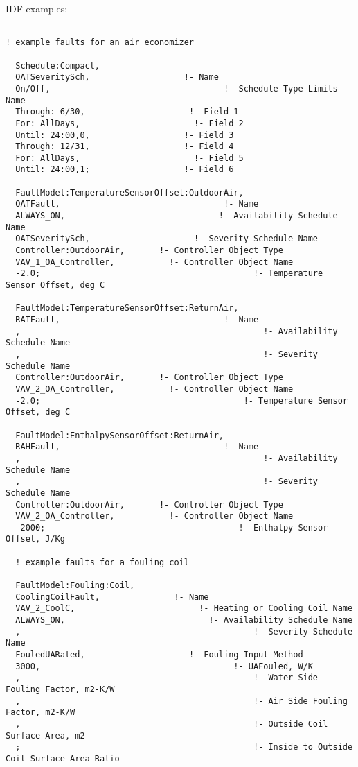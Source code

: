 IDF examples:

\begin{lstlisting}

! example faults for an air economizer

  Schedule:Compact,
  OATSeveritySch,                   !- Name
  On/Off,                                   !- Schedule Type Limits Name
  Through: 6/30,                     !- Field 1
  For: AllDays,                       !- Field 2
  Until: 24:00,0,                   !- Field 3
  Through: 12/31,                   !- Field 4
  For: AllDays,                       !- Field 5
  Until: 24:00,1;                   !- Field 6

  FaultModel:TemperatureSensorOffset:OutdoorAir,
  OATFault,                                 !- Name
  ALWAYS_ON,                               !- Availability Schedule Name
  OATSeveritySch,                     !- Severity Schedule Name
  Controller:OutdoorAir,       !- Controller Object Type
  VAV_1_OA_Controller,           !- Controller Object Name
  -2.0;                                           !- Temperature Sensor Offset, deg C

  FaultModel:TemperatureSensorOffset:ReturnAir,
  RATFault,                                 !- Name
  ,                                                 !- Availability Schedule Name
  ,                                                 !- Severity Schedule Name
  Controller:OutdoorAir,       !- Controller Object Type
  VAV_2_OA_Controller,           !- Controller Object Name
  -2.0;                                         !- Temperature Sensor Offset, deg C

  FaultModel:EnthalpySensorOffset:ReturnAir,
  RAHFault,                                 !- Name
  ,                                                 !- Availability Schedule Name
  ,                                                 !- Severity Schedule Name
  Controller:OutdoorAir,       !- Controller Object Type
  VAV_2_OA_Controller,           !- Controller Object Name
  -2000;                                       !- Enthalpy Sensor Offset, J/Kg

  ! example faults for a fouling coil

  FaultModel:Fouling:Coil,
  CoolingCoilFault,               !- Name
  VAV_2_CoolC,                         !- Heating or Cooling Coil Name
  ALWAYS_ON,                             !- Availability Schedule Name
  ,                                               !- Severity Schedule Name
  FouledUARated,                     !- Fouling Input Method
  3000,                                       !- UAFouled, W/K
  ,                                               !- Water Side Fouling Factor, m2-K/W
  ,                                               !- Air Side Fouling Factor, m2-K/W
  ,                                               !- Outside Coil Surface Area, m2
  ;                                               !- Inside to Outside Coil Surface Area Ratio
\end{lstlisting}

